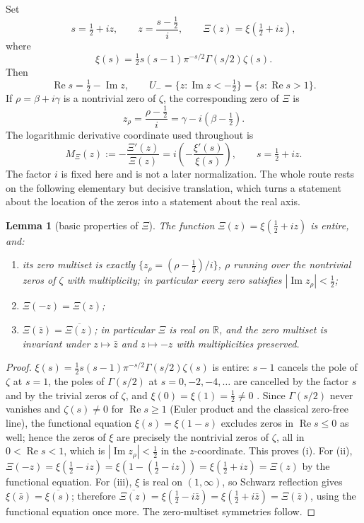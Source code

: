 \documentclass[11pt]{amsart}
\newtheorem{lemma}[theorem]{Lemma}
\theoremstyle{definition}
\theoremstyle{remark}
\theoremstyle{definition}
\renewcommand{\Re}{\operatorname{Re}}
\renewcommand{\Im}{\operatorname{Im}}
\newcommand{\half}{\tfrac{1}{2}}
\newcommand{\R}{\mathbb{R}}
\begin{document}
Set
\[
   s=\half+iz,\qquad z=\frac{s-\half}{i},\qquad
   \Xi(z)=\xi(\half+iz),
\]
where
\[
   \xi(s)=\half s(s-1)\pi^{-s/2}\Gamma(s/2)\zeta(s).
\]
Then
\[
   \Re s=\half-\Im z,\qquad
   U_-=\{z:\Im z<-\half\}=\{s:\Re s>1\}.
\]
If $\rho=\beta+i\gamma$ is a nontrivial zero of $\zeta$, the corresponding zero of $\Xi$ is
\[
   z_\rho=\frac{\rho-\half}{i}=\gamma-i(\beta-\half).
\]
The logarithmic derivative coordinate used throughout is
\[
   M_\Xi(z):=-\frac{\Xi'(z)}{\Xi(z)}
   =
   i\left(-\frac{\xi'(s)}{\xi(s)}\right),\qquad s=\half+iz.
\]
The factor $i$ is fixed here and is not a later normalization.  The whole route rests on the following
elementary but decisive translation, which turns a statement about the location of the zeros into a
statement about the real axis.

\begin{lemma}[basic properties of $\Xi$]\label{lem:xi-basic}
The function $\Xi(z)=\xi(\half+iz)$ is entire, and:
\begin{enumerate}[label=\textnormal{(\roman*)}]
\item its zero multiset is exactly $\{z_\rho=(\rho-\half)/i\}$, $\rho$ running over the nontrivial
zeros of $\zeta$ with multiplicity; in particular every zero satisfies $|\Im z_\rho|<\half$;
\item $\Xi(-z)=\Xi(z)$;
\item $\Xi(\bar z)=\overline{\Xi(z)}$; in particular $\Xi$ is real on $\R$, and the zero multiset is
invariant under $z\mapsto\bar z$ and $z\mapsto-z$ with multiplicities preserved.
\end{enumerate}
\end{lemma}

\begin{proof}
$\xi(s)=\half s(s-1)\pi^{-s/2}\Gamma(s/2)\zeta(s)$ is entire: $s-1$ cancels the pole of $\zeta$ at
$s=1$, the poles of $\Gamma(s/2)$ at $s=0,-2,-4,\ldots$ are cancelled by the factor $s$ and by the
trivial zeros of $\zeta$, and $\xi(0)=\xi(1)=\half\ne0$ \cite[Ch.~II]{Titchmarsh}.  Since
$\Gamma(s/2)$ never vanishes and $\zeta(s)\ne0$ for $\Re s\ge1$ (Euler product and the classical
zero-free line), the functional equation $\xi(s)=\xi(1-s)$ excludes zeros in $\Re s\le0$ as well;
hence the zeros of $\xi$ are precisely the nontrivial zeros of $\zeta$, all in $0<\Re s<1$, which is
$|\Im z_\rho|<\half$ in the $z$-coordinate.  This proves (i).  For (ii),
$\Xi(-z)=\xi(\half-iz)=\xi(1-(\half-iz))=\xi(\half+iz)=\Xi(z)$ by the functional equation.  For (iii),
$\xi$ is real on $(1,\infty)$, so Schwarz reflection gives $\xi(\bar s)=\overline{\xi(s)}$; therefore
$\overline{\Xi(z)}=\xi(\half-i\bar z)=\xi(\half+i\bar z)=\Xi(\bar z)$, using the functional equation
once more.  The zero-multiset symmetries follow.
\end{proof}
\end{document}
